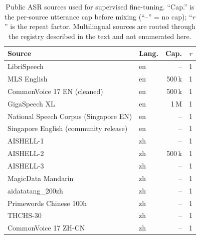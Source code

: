 \begin{table}[t]
  \caption{Public ASR sources used for supervised fine-tuning.
    ``Cap.'' is the per-source utterance cap before mixing (``--'' =
    no cap); ``$r$'' is the repeat factor.
    Multilingual sources are routed through the registry described in
    the text and not enumerated here.}
  \label{tab:data_asr}
  \centering
  \small
  \setlength{\tabcolsep}{4pt}
  \begin{tabular}{p{7.8cm}lrr}
    \toprule
    Source & Lang. & Cap. & $r$ \\
    \midrule
    LibriSpeech \cite{panayotov2015librispeech}                                     & en       & --   & 1 \\
    MLS English \cite{pratap2020mls}                                                & en       & 500\,k & 1 \\
    CommonVoice 17 EN (cleaned) \cite{ardila2020commonvoice}                        & en       & 500\,k & 1 \\
    GigaSpeech XL \cite{chen2021gigaspeech}                                         & en       & 1\,M & 1 \\
    National Speech Corpus (Singapore EN)                                           & en       & --   & 1 \\
    Singapore English (community release)                                           & en       & --   & 1 \\
    AISHELL-1 \cite{bu2017aishell}                                                  & zh       & --   & 1 \\
    AISHELL-2 \cite{du2018aishell2}                                                 & zh       & 500\,k & 1 \\
    AISHELL-3 \cite{shi2021aishell3}                                                & zh       & --   & 1 \\
    MagicData Mandarin \cite{magicdata}                                             & zh       & --   & 1 \\
    aidatatang\_200zh                                                                & zh       & --   & 1 \\
    Primewords Chinese 100h                                                          & zh       & --   & 1 \\
    THCHS-30 \cite{wang2015thchs30}                                                 & zh       & --   & 1 \\
    CommonVoice 17 ZH-CN \cite{ardila2020commonvoice}                               & zh       & --   & 1 \\

\end{tabular}
\end{table}
